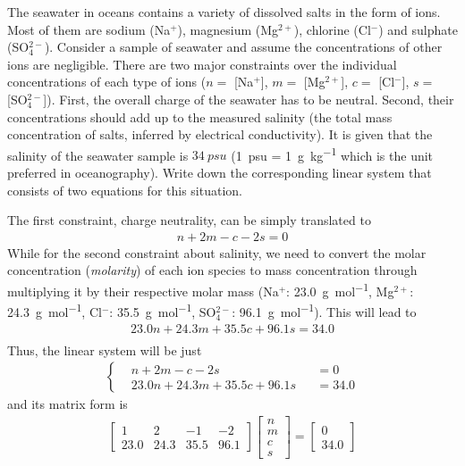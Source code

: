 \begin{exmp}
\label{exmp:seaion}
The seawater in oceans contains a variety of dissolved salts in the form of ions. Most of them are sodium (Na$^+$), magnesium (Mg$^{2+}$), chlorine (Cl$^-$) and sulphate (SO$_4^{2-}$). Consider a sample of seawater and assume the concentrations of other ions are negligible. There are two major constraints over the individual concentrations of each type of ions ($n=$ [Na$^+$], $m=$ [Mg$^{2+}$], $c=$ [Cl$^-$], $s=$ [SO$_4^{2-}$]). First, the overall charge of the seawater has to be neutral. Second, their concentrations should add up to the measured salinity (the total mass concentration of salts, inferred by electrical conductivity). It is given that the salinity of the seawater sample is $\SI{34}{psu}$ (\SI{1}{psu} = \SI{1}{\g\per\kg} which is the unit preferred in oceanography). Write down the corresponding linear system that consists of two equations for this situation.
\end{exmp}
\begin{solution}
The first constraint, charge neutrality, can be simply translated to
\begin{align*}
n + 2m - c - 2s = 0
\end{align*}
While for the second constraint about salinity, we need to convert the molar concentration (\textit{molarity}) of each ion species to mass concentration through multiplying it by their respective molar mass (Na$^+$: \SI{23.0}{\g \per \mol}, Mg$^{2+}$: \SI{24.3}{\g \per \mol}, Cl$^-$: \SI{35.5}{\g \per \mol}, SO$_4^{2-}$: \SI{96.1}{\g \per \mol}). This will lead to
\begin{align*}
23.0 n + 24.3 m + 35.5 c + 96.1s = 34.0 \\
\end{align*}
Thus, the linear system will be just
\begin{align*}
\left\{\begin{alignedat}{2}
& n + 2m - c - 2s& &= 0 \\
& 23.0 n + 24.3 m + 35.5 c + 96.1s& &= 34.0
\end{alignedat}\right.
\end{align*}
and its matrix form is
\begin{align*}
\begin{bmatrix}
1 & 2 & -1 & -2 \\
23.0 & 24.3 & 35.5 & 96.1    
\end{bmatrix}
\begin{bmatrix}
n \\
m \\
c \\
s
\end{bmatrix}
=
\begin{bmatrix}
0 \\
34.0
\end{bmatrix}
\end{align*}
\end{solution}

